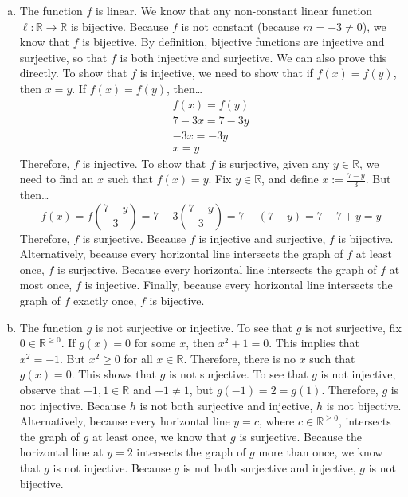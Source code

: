 \documentclass[11pt,letterpaper]{article}
\begin{document}
\sol 
\begin{enumerate}[(a)]
\item The function $f$ is linear. We know that any non-constant linear function $\ell: \mathbb{R} \to \mathbb{R}$ is bijective. Because $f$ is not constant (because $m= -3 \neq 0$), we know that $f$ is bijective. By definition, bijective functions are injective and surjective, so that $f$ is both injective and surjective. We can also prove this directly. To show that $f$ is injective, we need to show that if $f(x)= f(y)$, then $x= y$. If $f(x)= f(y)$, then\dots
	\[
	\begin{gathered}
	f(x)= f(y) \\
	7 - 3x= 7- 3y \\
	-3x= -3y \\
	x= y
	\end{gathered}
	\]
Therefore, $f$ is injective. To show that $f$ is surjective, given any $y \in \mathbb{R}$, we need to find an $x$ such that $f(x)= y$. Fix $y \in \mathbb{R}$, and define $x:= \frac{7 - y}{3}$. But then\dots
	\[
	f(x)= f \left( \dfrac{7 - y}{3} \right)= 7 - 3 \left( \dfrac{7 - y}{3} \right)= 7 - (7 - y)= 7 - 7 + y= y
	\]
Therefore, $f$ is surjective. Because $f$ is injective and surjective, $f$ is bijective. Alternatively, because every horizontal line intersects the graph of $f$ at least once, $f$ is surjective. Because every horizontal line intersects the graph of $f$ at most once, $f$ is injective. Finally, because every horizontal line intersects the graph of $f$ exactly once, $f$ is bijective. \pspace

\item The function $g$ is not surjective or injective. To see that $g$ is not surjective, fix $0 \in \mathbb{R}^{\geq 0}$. If $g(x)= 0$ for some $x$, then $x^2 + 1= 0$. This implies that $x^2= -1$. But $x^2 \geq 0$ for all $x \in \mathbb{R}$. Therefore, there is no $x$ such that $g(x)= 0$. This shows that $g$ is not surjective. To see that $g$ is not injective, observe that $-1, 1 \in \mathbb{R}$ and $-1 \neq 1$, but $g(-1)= 2= g(1)$. Therefore, $g$ is not injective. Because $h$ is not both surjective and injective, $h$ is not bijective. Alternatively, because every horizontal line $y= c$, where $c \in \mathbb{R}^{\geq 0}$, intersects the graph of $g$ at least once, we know that $g$ is surjective. Because the horizontal line at $y= 2$ intersects the graph of $g$ more than once, we know that $g$ is not injective. Because $g$ is not both surjective and injective, $g$ is not bijective. \pspace


\end{enumerate}
\end{document}

